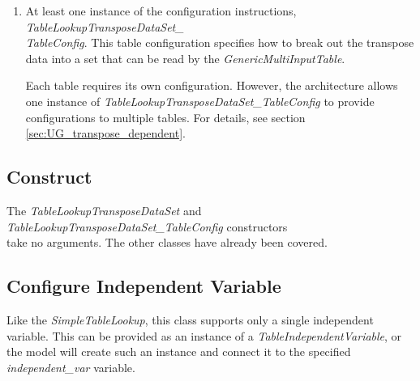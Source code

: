 \documentclass[11pt,fleqn]{report}
\begin{document}
\begin{enumerate}
       It is recommended -- but not required -- that the instances of the data
       tables are pre-instantiated and addressed via the table-configuration
       specification (see next item). If a table-configuration does not point
       to a pre-instantiated table instance, the
       \textit{TableLookupTransposeDataSet} instance will
       attempt to create the necessary table(s) when it processes the data (see
       section \ref{UG:transpose_data_set:populate}).

       \textbf{Caution} -- creating an instance of
       \textit{SingleInputTableVarDeriv} will also require populating the
       data for the first-derivative variable(s). Creating and populating an
       instance of \textit{GenericSingleInputTable} for the first-derivative
       will not automatically connect it to the derivs member in the instance
       of \textit{SingleInputTableVarDeriv}. It is strongly recommended that,
       when planning to use a \textit{SingleInputTableVarDeriv}, a
       pre-existing instance should be used; both the inherent and embedded
       instances of \textit{GenericSingleInputTable} can then be configured
       independently without the difficulty of trying to connect them
       afterwards.

.
 \item At least one instance of the configuration instructions,
       \textit{TableLookupTransposeDataSet\_\\TableConfig}. This table
       configuration specifies how to break out the transpose data into a
       set that can be read by the \textit{GenericMultiInputTable}.

       Each table requires its own configuration.  However, the architecture
       allows one instance of \textit{TableLookupTransposeDataSet\_TableConfig}
       to provide configurations to multiple tables.  For details, see section
       \ref{sec:UG_transpose_dependent}.
\end{enumerate}


\subsection{Construct}
The \textit{TableLookupTransposeDataSet} and
\textit{TableLookupTransposeDataSet\_TableConfig} constructors \\take no
arguments.  The other classes have already been covered.

\subsection{Configure Independent Variable}
Like the \textit{SimpleTableLookup}, this class supports only a single
independent variable.  This can be provided as an instance of a
\textit{TableIndependentVariable}, or the model will create such an instance
and connect it to the specified \textit{independent\_var} variable.
\end{document}
